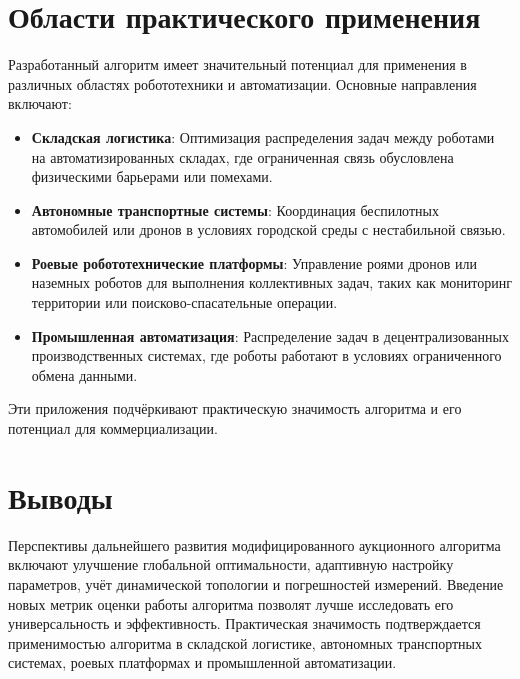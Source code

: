 \section{Области практического применения}
Разработанный алгоритм имеет значительный потенциал для применения в различных областях робототехники и автоматизации. Основные направления включают:
\begin{itemize}
    \item \textbf{Складская логистика}: Оптимизация распределения задач между роботами на автоматизированных складах, где ограниченная связь обусловлена физическими барьерами или помехами.
    \item \textbf{Автономные транспортные системы}: Координация беспилотных автомобилей или дронов в условиях городской среды с нестабильной связью.
    \item \textbf{Роевые робототехнические платформы}: Управление роями дронов или наземных роботов для выполнения коллективных задач, таких как мониторинг территории или поисково-спасательные операции.
    \item \textbf{Промышленная автоматизация}: Распределение задач в децентрализованных производственных системах, где роботы работают в условиях ограниченного обмена данными.
\end{itemize}
Эти приложения подчёркивают практическую значимость алгоритма и его потенциал для коммерциализации.


\section{Выводы}
Перспективы дальнейшего развития модифицированного аукционного алгоритма включают улучшение глобальной оптимальности, адаптивную настройку параметров, учёт динамической топологии и погрешностей измерений. Введение новых метрик оценки работы алгоритма позволят лучше исследовать его универсальность и эффективность. Практическая значимость подтверждается применимостью алгоритма в складской логистике, автономных транспортных системах, роевых платформах и промышленной автоматизации.